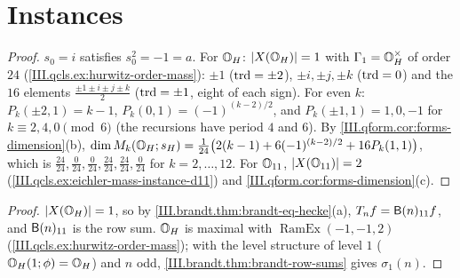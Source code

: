 \section{Instances}\label{sec:brandt-instances}

\begin{example}
\end{example}
\begin{proof}
$s_0=i$ satisfies $s_0^2=-1=a$. For $\mathbb{O}_H$: $\lvert X(\mathbb{O}_H)\rvert=1$ with $\Gamma_1=\mathbb{O}_H^\times$ of order $24$ (\cref{III.qcls.ex:hurwitz-order-mass}): $\pm1$
($\operatorname{trd}=\pm2$), $\pm i,\pm j,\pm k$ ($\operatorname{trd}=0$) and the $16$ elements $\frac{\pm1\pm i\pm j\pm k}2$ ($\operatorname{trd}=\pm1$, eight of each sign). For even $k$:
$P_k(\pm2,1)=k-1$, $P_k(0,1)=(-1)^{(k-2)/2}$, and $P_k(\pm1,1)=1,0,-1$ for $k\equiv2,4,0\pmod6$ (the recursions have period $4$ and $6$). By
\cref{III.qform.cor:forms-dimension}(b),
$\dim M_k(\mathbb{O}_H;s_H)=\frac1{24}\bigl(2(k-1)+6(-1)^{(k-2)/2}+16P_k(1,1)\bigr)$, which is $\frac{24}{24},\frac0{24},\frac0{24},\frac{24}{24},\frac{24}{24},\frac0{24}$ for
$k=2,\dots,12$. For $\mathbb{O}_{11}$, $\lvert X(\mathbb{O}_{11})\rvert=2$ (\cref{III.qcls.ex:eichler-mass-instance-d11}) and \cref{III.qform.cor:forms-dimension}(c).
\end{proof}

\begin{example}
\end{example}
\begin{proof}
$\lvert X(\mathbb{O}_H)\rvert=1$, so by \cref{III.brandt.thm:brandt-eq-hecke}(a), $T_nf=\mathsf{B}(n)_{11}f$, and $\mathsf{B}(n)_{11}$ is the row sum. $\mathbb{O}_H$ is maximal with
$\operatorname{RamEx}(-1,-1,2)$ (\cref{III.qcls.ex:hurwitz-order-mass}); with the level structure of level $1$ ($\mathbb{O}_H(1;\phi)=\mathbb{O}_H$) and $n$ odd,
\cref{III.brandt.thm:brandt-row-sums} gives $\sigma_1(n)$.
\end{proof}

